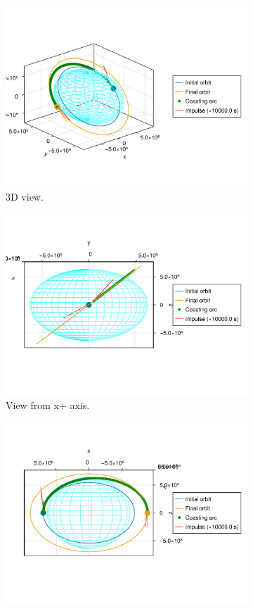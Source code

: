 \begin{figure}[htbp]
    \centering
    \begin{subfigure}{0.49\linewidth}
        \includegraphics[width=0.8\linewidth]{../results/j2/hohmann/CICIC_3d.png}
        \caption{3D view.}
    \end{subfigure}
    \begin{subfigure}{0.49\linewidth}
        \includegraphics[width=0.8\linewidth]{../results/j2/hohmann/CICIC_x+.png}
        \caption{View from x+ axis.}
    \end{subfigure}
    \begin{subfigure}{0.49\linewidth}
        \includegraphics[width=0.8\linewidth]{../results/j2/hohmann/CICIC_y+.png}

\end{subfigure}
\end{figure}
